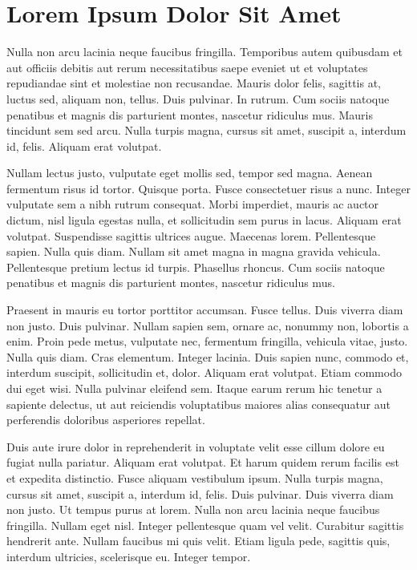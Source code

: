 \chapter{Lorem Ipsum Dolor Sit Amet}
Nulla non arcu lacinia neque faucibus fringilla. Temporibus autem quibusdam et aut officiis debitis aut rerum necessitatibus saepe eveniet ut et voluptates repudiandae sint et molestiae non recusandae. Mauris dolor felis, sagittis at, luctus sed, aliquam non, tellus. Duis pulvinar. In rutrum. Cum sociis natoque penatibus et magnis dis parturient montes, nascetur ridiculus mus. Mauris tincidunt sem sed arcu. Nulla turpis magna, cursus sit amet, suscipit a, interdum id, felis. Aliquam erat volutpat.

Nullam lectus justo, vulputate eget mollis sed, tempor sed magna. Aenean fermentum risus id tortor. Quisque porta. Fusce consectetuer risus a nunc. Integer vulputate sem a nibh rutrum consequat. Morbi imperdiet, mauris ac auctor dictum, nisl ligula egestas nulla, et sollicitudin sem purus in lacus. Aliquam erat volutpat. Suspendisse sagittis ultrices augue. Maecenas lorem. Pellentesque sapien. Nulla quis diam. Nullam sit amet magna in magna gravida vehicula. Pellentesque pretium lectus id turpis. Phasellus rhoncus. Cum sociis natoque penatibus et magnis dis parturient montes, nascetur ridiculus mus.

Praesent in mauris eu tortor porttitor accumsan. Fusce tellus. Duis viverra diam non justo. Duis pulvinar. Nullam sapien sem, ornare ac, nonummy non, lobortis a enim. Proin pede metus, vulputate nec, fermentum fringilla, vehicula vitae, justo. Nulla quis diam. Cras elementum. Integer lacinia. Duis sapien nunc, commodo et, interdum suscipit, sollicitudin et, dolor. Aliquam erat volutpat. Etiam commodo dui eget wisi. Nulla pulvinar eleifend sem. Itaque earum rerum hic tenetur a sapiente delectus, ut aut reiciendis voluptatibus maiores alias consequatur aut perferendis doloribus asperiores repellat.

Duis aute irure dolor in reprehenderit in voluptate velit esse cillum dolore eu fugiat nulla pariatur. Aliquam erat volutpat. Et harum quidem rerum facilis est et expedita distinctio. Fusce aliquam vestibulum ipsum. Nulla turpis magna, cursus sit amet, suscipit a, interdum id, felis. Duis pulvinar. Duis viverra diam non justo. Ut tempus purus at lorem. Nulla non arcu lacinia neque faucibus fringilla. Nullam eget nisl. Integer pellentesque quam vel velit. Curabitur sagittis hendrerit ante. Nullam faucibus mi quis velit. Etiam ligula pede, sagittis quis, interdum ultricies, scelerisque eu. Integer tempor.

